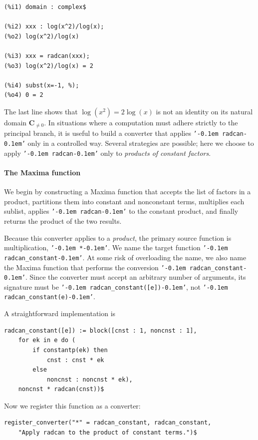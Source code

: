 \documentclass[12pt,fleqn]{extarticle}
\newcommand{\ttq}[1]{\texttt{'\kern-0.1em #1\kern-0.1em'}}
\newenvironment{maximabox}
  {\begin{tcolorbox}[
      breakable,
      enhanced,
      colback=white,
      colframe=black!8,
      boxrule=0pt,
      borderline west={2.2pt}{0pt}{black!25},
      arc=1pt,
      left=11pt,
      right=7pt,
      top=9pt,
      bottom=9pt,
      before skip=14pt,
      after skip=14pt
    ]}
  {\end{tcolorbox}}
\newcommand{\complex}{\mathbf{C}}
\begin{document}
\begin{maximabox}
\begin{verbatim}
(%i1) domain : complex$

(%i2) xxx : log(x^2)/log(x);
(%o2) log(x^2)/log(x)

(%i3) xxx = radcan(xxx);
(%o3) log(x^2)/log(x) = 2

(%i4) subst(x=-1, %);
(%o4) 0 = 2
\end{verbatim}
\end{maximabox}
\noindent
The last line shows that $\log(x^2) = 2\log(x)$ is not an identity on its natural domain 
$\complex_{\neq 0}$. In situations where a computation must adhere strictly to the principal branch, it is useful to build a converter that applies \ttq{radcan} only in a controlled way.  
 Several strategies are possible; here we choose to apply \ttq{radcan} only to \emph{products of constant factors}.


\paragraph{The Maxima function}
We begin by constructing a Maxima function that accepts the list of factors in a product, partitions them into constant and nonconstant terms, multiplies each sublist, applies \ttq{radcan} to the constant product, and finally returns the product of the two results.

Because this converter applies to a \emph{product}, the primary source function is multiplication, \ttq{*}. We name the target function \ttq{radcan\_constant}. At some risk of overloading the name, we also name the Maxima function that performs the conversion \ttq{radcan\_constant}. Since the converter must accept an arbitrary number of arguments, its signature must be \ttq{radcan\_constant([e])}, not
\ttq{radcan\_constant(e)}.

A straightforward implementation is

\begin{maximabox}
\begin{verbatim}
radcan_constant([e]) := block([cnst : 1, noncnst : 1],
    for ek in e do (
        if constantp(ek) then
            cnst : cnst * ek
        else
            noncnst : noncnst * ek),
    noncnst * radcan(cnst))$
\end{verbatim}
\end{maximabox}

\noindent
Now we register this function as a converter:

\begin{maximabox}
\begin{verbatim}
register_converter("*" = radcan_constant, radcan_constant,
    "Apply radcan to the product of constant terms.")$
\end{verbatim}
\end{maximabox}
\end{document}
